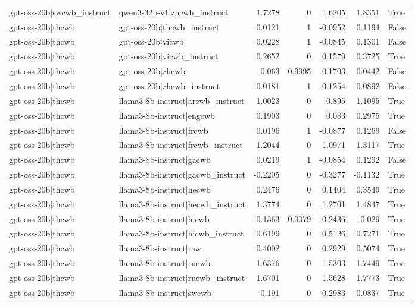 \begin{table}
\begin{tabular}{l l r r r r l}
gpt-oss-20b|swcwb_instruct & qwen3-32b-v1|zhcwb_instruct & 1.7278 & 0 & 1.6205 & 1.8351 & True \\
gpt-oss-20b|thcwb & gpt-oss-20b|thcwb_instruct & 0.0121 & 1 & -0.0952 & 0.1194 & False \\
gpt-oss-20b|thcwb & gpt-oss-20b|vicwb & 0.0228 & 1 & -0.0845 & 0.1301 & False \\
gpt-oss-20b|thcwb & gpt-oss-20b|vicwb_instruct & 0.2652 & 0 & 0.1579 & 0.3725 & True \\
gpt-oss-20b|thcwb & gpt-oss-20b|zhcwb & -0.063 & 0.9995 & -0.1703 & 0.0442 & False \\
gpt-oss-20b|thcwb & gpt-oss-20b|zhcwb_instruct & -0.0181 & 1 & -0.1254 & 0.0892 & False \\
gpt-oss-20b|thcwb & llama3-8b-instruct|arcwb_instruct & 1.0023 & 0 & 0.895 & 1.1095 & True \\
gpt-oss-20b|thcwb & llama3-8b-instruct|engcwb & 0.1903 & 0 & 0.083 & 0.2975 & True \\
gpt-oss-20b|thcwb & llama3-8b-instruct|frcwb & 0.0196 & 1 & -0.0877 & 0.1269 & False \\
gpt-oss-20b|thcwb & llama3-8b-instruct|frcwb_instruct & 1.2044 & 0 & 1.0971 & 1.3117 & True \\
gpt-oss-20b|thcwb & llama3-8b-instruct|gacwb & 0.0219 & 1 & -0.0854 & 0.1292 & False \\
gpt-oss-20b|thcwb & llama3-8b-instruct|gacwb_instruct & -0.2205 & 0 & -0.3277 & -0.1132 & True \\
gpt-oss-20b|thcwb & llama3-8b-instruct|hecwb & 0.2476 & 0 & 0.1404 & 0.3549 & True \\
gpt-oss-20b|thcwb & llama3-8b-instruct|hecwb_instruct & 1.3774 & 0 & 1.2701 & 1.4847 & True \\
gpt-oss-20b|thcwb & llama3-8b-instruct|hicwb & -0.1363 & 0.0079 & -0.2436 & -0.029 & True \\
gpt-oss-20b|thcwb & llama3-8b-instruct|hicwb_instruct & 0.6199 & 0 & 0.5126 & 0.7271 & True \\
gpt-oss-20b|thcwb & llama3-8b-instruct|raw & 0.4002 & 0 & 0.2929 & 0.5074 & True \\
gpt-oss-20b|thcwb & llama3-8b-instruct|rucwb & 1.6376 & 0 & 1.5303 & 1.7449 & True \\
gpt-oss-20b|thcwb & llama3-8b-instruct|rucwb_instruct & 1.6701 & 0 & 1.5628 & 1.7773 & True \\
gpt-oss-20b|thcwb & llama3-8b-instruct|swcwb & -0.191 & 0 & -0.2983 & -0.0837 & True \\

\end{tabular}
\end{table}
